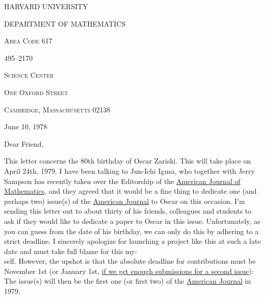 HARVARD UNIVERSITY

DEPARTMENT OF MATHEMATICS

\textsc{Area Code 617}

495--2170


\textsc{Science Center}

\textsc{One Oxford Street}

\textsc{Cambridge, Massachusetts 02138}

June 10, 1978

Dear Friend,

This letter concerns the 80th birthday of Oscar Zariski. This will take place
on April 24th, 1979. I have been talking to Jun-Ichi Igusa, who together with
Jerry Sampson has recently taken over the Editorship of the \uline{American Journal
of Mathematics}, and they agreed that it would be a fine thing to dedicate one
(and perhaps two) issue(s) of the \uline{American Journal} to Oscar on this occasion.
I'm sending this letter out to about thirty of his friends, colleagues and
students to ask if they would like to dedicate a paper to Oscar in this issue.
Unfortunately, as you can guess from the date of his birthday, we can only do
this by adhering to a strict deadline. I sincerely apologize for launching
a project like this at such a late date and must take full blame for this my-\\
self. However, the upshot is that the absolute deadline for contributions
must be November 1st (or January 1st, \uline{if we get enough submissions for a second
issue}): The issue(s) will then be the first one (or first two) of the \uline{American
Journal} in 1979.

